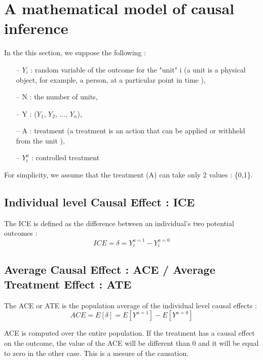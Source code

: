 \documentclass{article}
\begin{document}
 



\section{A mathematical model of causal inference}

In the this section, we suppose the following : 

\begin{itemize}
\item[--] $Y_{i}$ : random variable of the outcome for the "unit" i  (a unit is a physical object, for example, a person, at a particular point in time \cite{rubin2005causal}),
\item[--] N : the number of units,
\item[--] Y : ($Y_{1}$, $Y_{2}$, ..., $Y_{n}$),
\item[--] A : treatment (a treatment is an action that can be applied or withheld from the unit \cite{rubin2005causal}),
\item[--] $Y_{i}^{a}$ : controlled treatment 
\end{itemize}


For simplicity, we assume that the treatment (A) can take only 2 values : \{0,1\}.


\subsection{Individual level Causal Effect : ICE}
The ICE is defined as the difference between an individual’s two potential outcomes :
$$ ICE = \delta = Y_{i}^{a=1} - Y_{i}^{a=0} $$



\subsection{Average Causal Effect : ACE / Average Treatment Effect : ATE}
The ACE or ATE is the population average of the individual level causal effects :
$$ ACE = E[\delta] = E[Y^{a=1}] - E[Y^{a=0}] $$

ACE is computed over the entire population. If the treatment has a causal effect on the outcome, the value of the ACE will be different than 0 and it will be equal to zero in the other case. This is a mesure of the causation. 
\end{document}
